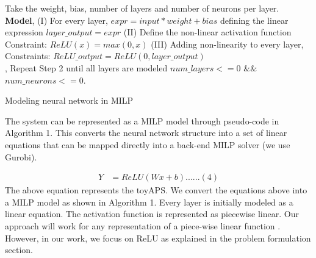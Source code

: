 \begin{algorithm}
	Take the weight, bias, number of layers and number of neurons per layer. \\
	
	\textbf{Model}, \linebreak
	(I) For every  layer,  $expr = input * weight + bias$
	\linebreak 
	defining the linear expression
	\linebreak
	$layer\_output = expr$
	\linebreak
	(II) Define the non-linear activation function 
	\linebreak 
	\qquad Constraint: $ReLU(x) = max (0,x)$
	\linebreak
	(III) Adding non-linearity to every layer,
	\linebreak
	Constraints: $ReLU\_output = ReLU(0, layer\_output)$\\, 
	Repeat Step 2 until all layers are modeled 
	\linebreak
	$num\_layers < = 0$   $ \&\& $ 
	$ num\_neurons < = 0 $.
	
	\caption{Modeling neural network in MILP}
	\label{algo:b}
\end{algorithm}


The system can be represented as a MILP model through pseudo-code in Algorithm 1. This converts the neural network structure into a set of linear equations that can be mapped directly into a back-end MILP solver (we use Gurobi). 

\begin{align*}
Y &=  ReLU(Wx + b) ...... (4)
\end{align*}
The above equation represents the toyAPS. We convert the equations above into a MILP model as shown in Algorithm 1. Every layer is initially modeled as a linear equation. The activation function is represented as piecewise linear. Our approach will work for any representation of a piece-wise linear function . However, in our work, we focus on ReLU as explained in the problem formulation section. 

